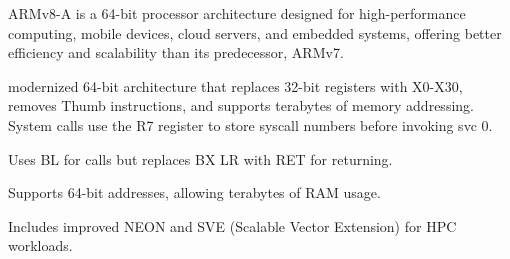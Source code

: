 \begin{NxSSSBox}
	\begin{NxIDBox}
		ARMv8-A is a 64-bit processor architecture designed for high-performance computing, mobile devices, cloud servers, and embedded systems, offering better efficiency and scalability than its predecessor, ARMv7.
	\end{NxIDBox}
\end{NxSSSBox}

\begin{NxSSSSBox}
	\begin{NxIDBox}
		modernized 64-bit architecture that replaces 32-bit registers with X0-X30, removes Thumb instructions, and supports terabytes of memory addressing.	System calls use the R7 register to store syscall numbers before invoking svc 0.
	\end{NxIDBox}
\end{NxSSSSBox}

\begin{NxSSSSBox}
	\begin{NxIDBox}
		Uses BL for calls but replaces BX LR with RET for returning.
	\end{NxIDBox}
\end{NxSSSSBox}

\begin{NxSSSSBox}
	\begin{NxIDBox}
		Supports 64-bit addresses, allowing terabytes of RAM usage.
	\end{NxIDBox}
\end{NxSSSSBox}

\begin{NxSSSSBox}
	\begin{NxIDBox}
		Includes improved NEON and SVE (Scalable Vector Extension) for HPC workloads.
	\end{NxIDBox}
\end{NxSSSSBox}


